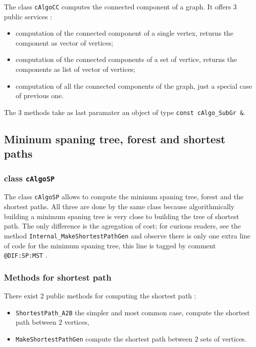 The class {\tt cAlgoCC} computes the connected component of a graph. It offers $3$ public services :

\begin{itemize}
    \item computation of the connected component of a single vertex, returns the component as vector of vertices;

    \item computation of the connected components of a set of vertice, returns the components as list of vector of vertices;

    \item computation of all the connected components of the graph, just a special case of previous one.
\end{itemize}

The $3$ methods take as last paramater an object of type {\tt const cAlgo\_SubGr \&}.



\subsection{Mininum spaning tree, forest and shortest paths}

\subsubsection{class {\tt cAlgoSP}}

The class {\tt cAlgoSP} allows to compute the mininum spaning tree, forest and the shortest paths.
All three are done by the same class because algorithmically building a minimum spaning tree
is very close to building the tree of shortest path. 
The only difference is the agregation of cost; for curious readers, see the
method {\tt Internal\_MakeShortestPathGen} and observe there is only one extra 
line of code for the minimum spaning tree, this line is tagged by comment {\tt  @DIF:SP:MST} .


\subsubsection{Methods for shortest path}

There  exist  $2$ public methods for computing the shortest path :

\begin{itemize}
    \item {\tt ShortestPath\_A2B} the simpler and most common case,
          compute the shortest path between $2$ vertices,

    \item {\tt MakeShortestPathGen} compute the shortest path between $2$ sets of vertices.
\end{itemize}


